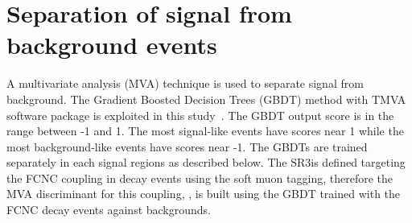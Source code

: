 %
%


\section{Separation of signal from background events}
\label{sec:separation}
A multivariate analysis (MVA) technique is used to separate signal from background. 
The Gradient Boosted Decision Trees (GBDT) method with TMVA software package 
is exploited in this study~\cite{BDTG,TMVA}. The GBDT output score is in the range between -1 and 1.
The most signal-like events have scores near 1 while the most background-like events have scores near -1. The GBDTs are trained separately in each signal regions as described below.
The SR3\tZc is defined targeting the FCNC \tZc coupling in \ttbar decay events
using the soft muon tagging, therefore the MVA discriminant for this coupling, \Dthree,  is built using the GBDT trained with the FCNC \tZc \ttbar decay events against backgrounds.

